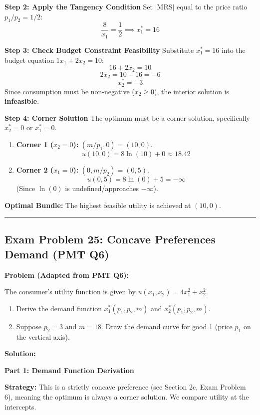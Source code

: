 \documentclass{article}
\begin{document}
\textbf{Step 2: Apply the Tangency Condition}
Set $|\text{MRS}|$ equal to the price ratio $p_1/p_2 = 1/2$:
\[ \frac{8}{x_1} = \frac{1}{2} \implies x_1^* = 16 \]

\textbf{Step 3: Check Budget Constraint Feasibility}
Substitute $x_1^*=16$ into the budget equation $1x_1 + 2x_2 = 10$:
\[ 16 + 2x_2 = 10 \]
\[ 2x_2 = 10 - 16 = -6 \]
\[ x_2^* = -3 \]
Since consumption must be non-negative ($x_2 \geq 0$), the interior solution is \textbf{infeasible}.

\textbf{Step 4: Corner Solution}
The optimum must be a corner solution, specifically $x_2^*=0$ or $x_1^* =0$.

\begin{enumerate}
\item \textbf{Corner 1 ($x_2=0$):} $(m/p_1, 0) = (10, 0)$.
\[ u(10, 0) = 8 \ln(10) + 0 \approx 18.42 \]
\item \textbf{Corner 2 ($x_1=0$):} $(0, m/p_2) = (0, 5)$.
\[ u(0, 5) = 8 \ln(0) + 5 = -\infty \]
(Since $\ln(0)$ is undefined/approaches $-\infty$).
\end{enumerate}

\textbf{Optimal Bundle:} The highest feasible utility is achieved at $(10, 0)$.

\vspace{1em}\hrule\vspace{1em}

\subsection*{Exam Problem 25: Concave Preferences Demand (PMT Q6)}

\textbf{Problem (Adapted from PMT Q6):}

The consumer’s utility function is given by $u(x_1, x_2) = 4x_1^2 + x_2^2$.
\begin{enumerate}
\item Derive the demand function $x_1^*(p_1, p_2, m)$ and $x_2^*(p_1, p_2, m)$.
\item Suppose $p_2 = 3$ and $m = 18$. Draw the demand curve for good 1 (price $p_1$ on the vertical axis).
\end{enumerate}

\textbf{Solution:}

\textbf{Part 1: Demand Function Derivation}

\textbf{Strategy:} This is a strictly concave preference (see Section 2c, Exam Problem 6), meaning the optimum is always a corner solution. We compare utility at the intercepts.
\end{document}
